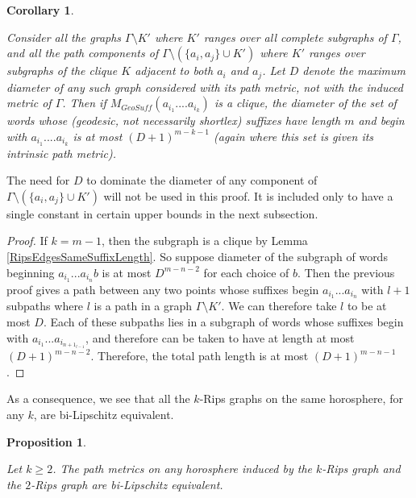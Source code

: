\documentclass{amsart}
\newtheorem{corollary}[theorem]{Corollary}
\newtheorem{proposition}[theorem]{Proposition}
\theoremstyle{definition}
\theoremstyle{remark}
\begin{document}
	\begin{corollary} \label{RipsSubgraphDiameterBound}
		
		Consider all the graphs $\Gamma\setminus K'$ where $K'$ ranges over all complete subgraphs of $\Gamma$, and all the path components of $\Gamma\setminus (\{a_i, a_j\}\cup K')$ where $K'$ ranges over subgraphs of the clique $K$ adjacent to both $a_i$ and $a_j$. Let $D$ denote the maximum diameter of any such graph considered with its path metric, not with the induced metric of $\Gamma$. Then if $M_{GeoSuff}(a_{i_1}....a_{i_k})$ is a clique, the diameter of the set of words whose (geodesic, not necessarily shortlex) suffixes have length $m$ and begin with $a_{i_1}....a_{i_k}$ is at most $(D+1)^{m-k-1}$ (again where this set is given its intrinsic path metric).
		
	\end{corollary}
	
	The need for $D$ to dominate the diameter of any component of $\Gamma\setminus (\{a_i, a_j\}\cup K')$ will not be used in this proof. It is included only to have a single constant in certain upper bounds in the next subsection.
	
	\begin{proof}
		
		If $k=m-1$, then the subgraph is a clique by Lemma \ref{RipsEdgesSameSuffixLength}. So suppose diameter of the subgraph of words beginning $a_{i_1}...a_{i_n}b$ is at most $D^{m-n-2}$ for each choice of $b$. Then the previous proof gives a path between any two points whose suffixes begin $a_{i_1}...a_{i_n}$ with $l+1$ subpaths where $l$ is a path in a graph $\Gamma\setminus K'$. We can therefore take $l$ to be at most $D$. Each of these subpaths lies in a subgraph of words whose suffixes begin with $a_{i_1}...a_{i_{n+1_{l-1}}}$, and therefore can be taken to have at length at most $(D+1)^{m-n-2}$. Therefore, the total path length is at most $(D+1)^{m-n-1}$.		
	 \end{proof}
	
	As a consequence, we see that all the $k$-Rips graphs on the same horosphere, for any $k$, are bi-Lipschitz equivalent.
	
	\begin{proposition} \label{RipsGraphBiLipschitzEquivalence}
		
		Let $k\ge 2$. The path metrics on any horosphere induced by the $k$-Rips graph and the $2$-Rips graph are bi-Lipschitz equivalent.
		
	\end{proposition}
	
\end{document}

